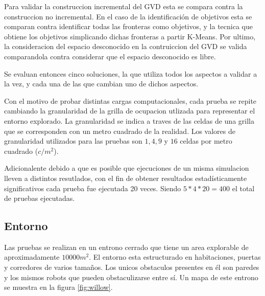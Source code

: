Para validar la construccion incremental del GVD esta se compara contra la
construccion no incremental. En el caso de la identificación de objetivos esta se
comparan contra identificar todas las fronteras como objetivos, y la tecnica
que obtiene los objetivos simplicando dichas fronteras a partir K-Means. Por
ultimo, la consideracion del espacio desconocido en la contruiccion del GVD se
valida comparandola contra considerar que el espacio desconocido es libre. 

Se evaluan entonces cinco soluciones, la que utiliza todos los aspectos a
validar a la vez, y cada una de las que cambian uno de dichos aspectos.

Con el motivo de probar distintas cargas computacionales, cada prueba se repite
cambiando la granularidad de la grilla de ocupacion utlizada para representar
el entorno explorado. La granularidad se indica a traves de las celdas de una
grilla que se corresponden con un metro cuadrado de la realidad. Los valores de
granularidad utilizados para las pruebas son $1,4,9$ y $16$ celdas
por metro cuadrado ($c/m^2$). 

Adicionalente debido a que es posible que ejecuciones de un misma simulacion
lleven a distintos resutlados, con el fin de obtener resultados
estadísticamente significativos cada prueba fue ejecutada 20 veces. Siendo 
$5*4*20=400$ el total de pruebas ejecutadas.


\subsection{Entorno}
Las pruebas se realizan en un entrono cerrado que tiene un area explorable de
aproximadamente $10000m^2$. El entorno esta estructurado en habitaciones,
puertas y corredores de varios tamaños. Los unicos obstaculos presentes en él
son paredes y los mismos robots que pueden obstaculizarse entre
sí. Un mapa de este entrono se muestra en la figura
\ref{fig:willow}.

